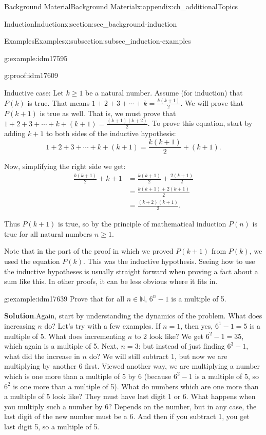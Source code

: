 \documentclass[oneside,10pt,]{book}
\numberwithin{equation}{chapter}
\def\N{\mathbb N}
\newcommand{\amp}{&}
\begin{document}
\begin{appendixptx}{Background Material}{}{Background Material}{}{}{x:appendix:ch_additionalTopics}
\begin{sectionptx}{Induction}{}{Induction}{}{}{x:section:sec_background-induction}
\begin{subsectionptx}{Examples}{}{Examples}{}{}{x:subsection:subsec_induction-examples}
\begin{example}{}{g:example:idm17595}
\begin{proofptx}{}{g:proof:idm17609}
\par
Inductive case: Let \(k \ge 1\) be a natural number. Assume (for induction) that \(P(k)\) is true. That means \(1 + 2 + 3 + \cdots + k = \frac{k(k+1)}{2}\). We will prove that \(P(k+1)\) is true as well. That is, we must prove that \(1 + 2 + 3 + \cdots + k + (k+1) = \frac{(k+1)(k+2)}{2}\). To prove this equation, start by adding \(k+1\) to both sides of the inductive hypothesis:%
\begin{equation*}
1 + 2 + 3 + \cdots + k + (k+1) = \frac{k(k+1)}{2} + (k+1).
\end{equation*}
%
\par
Now, simplifying the right side we get:%
\begin{align*}
\frac{k(k+1)}{2} + k+1 \amp = \frac{k(k+1)}{2} + \frac{2(k+1)}{2}\\
\amp = \frac{k(k+1) + 2(k+1)}{2}\\
\amp = \frac{(k+2)(k+1)}{2}.
\end{align*}
%
\par
Thus \(P(k+1)\) is true, so by the principle of mathematical induction \(P(n)\) is true for all natural numbers \(n \ge 1\).%
\end{proofptx}
\end{example}
Note that in the part of the proof in which we proved \(P(k+1)\) from \(P(k)\), we used the equation \(P(k)\). This was the inductive hypothesis. Seeing how to use the inductive hypotheses is usually straight forward when proving a fact about a sum like this. In other proofs, it can be less obvious where it fits in.%
\begin{example}{}{g:example:idm17639}%
Prove that for all \(n \in \N\), \(6^n - 1\) is a multiple of 5.%
\par\smallskip%
\noindent\textbf{Solution}.\hypertarget{g:solution:idm17644}{}\quad{}Again, start by understanding the dynamics of the problem. What does increasing \(n\) do? Let's try with a few examples. If \(n = 1\), then yes, \(6^1 - 1 = 5\) is a multiple of 5. What does incrementing \(n\) to 2 look like? We get \(6^2 - 1 = 35\), which again is a multiple of 5. Next, \(n = 3\): but instead of just finding \(6^3 - 1\), what did the increase in \(n\) do? We will still subtract 1, but now we are multiplying by another 6 first. Viewed another way, we are multiplying a number which is one more than a multiple of 5 by 6 (because \(6^2 - 1\) is a multiple of 5, so \(6^2\) is one more than a multiple of 5). What do numbers which are one more than a multiple of 5 look like? They must have last digit 1 or 6. What happens when you multiply such a number by 6? Depends on the number, but in any case, the last digit of the new number must be a 6. And then if you subtract 1, you get last digit 5, so a multiple of 5.%

\end{example}
\end{subsectionptx}
\end{sectionptx}
\end{appendixptx}
\end{document}
